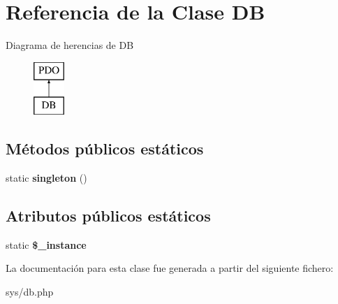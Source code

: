 \hypertarget{class_d_b}{}\section{Referencia de la Clase D\+B}
\label{class_d_b}
Diagrama de herencias de D\+B\begin{figure}[H]
\begin{center}
\leavevmode
\includegraphics[height=2.000000cm]{class_d_b}
\end{center}
\end{figure}
\subsection*{Métodos públicos estáticos}
\begin{DoxyCompactItemize}
\item 
\hypertarget{class_d_b_af527068985bac6010736b5959643eda7}{}static {\bfseries singleton} ()\label{class_d_b_af527068985bac6010736b5959643eda7}

\end{DoxyCompactItemize}
\subsection*{Atributos públicos estáticos}
\begin{DoxyCompactItemize}
\item 
\hypertarget{class_d_b_ac350be23da328a6f5429313efc9b96e4}{}static {\bfseries \$\+\_\+instance}\label{class_d_b_ac350be23da328a6f5429313efc9b96e4}

\end{DoxyCompactItemize}


La documentación para esta clase fue generada a partir del siguiente fichero\+:\begin{DoxyCompactItemize}
\item 
sys/db.\+php\end{DoxyCompactItemize}
